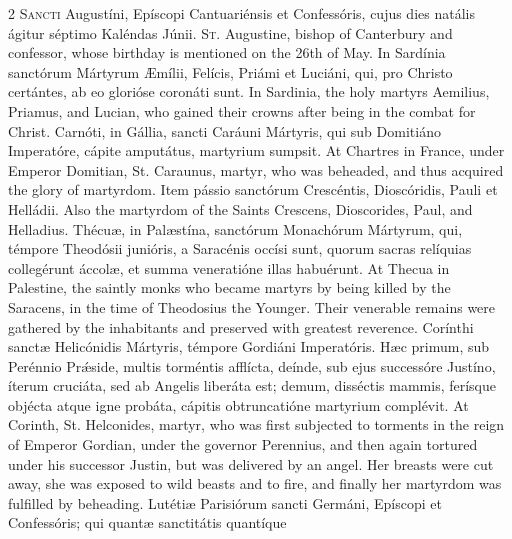 \begin{paracol}{2}
\lettrine[lines=2]{S}{ancti} Augustíni, 
 Epíscopi Cantuariénsis et Confessóris, cujus dies natális ágitur séptimo 
 Kaléndas Júnii.
\switchcolumn
{}
\lettrine[lines=2]{S}{t.} Augustine, bishop of Canterbury 
 and confessor, whose birthday is mentioned on the 26th of May.
\switchcolumn*
{}
In Sardínia sanctórum 
 Mártyrum Æmílii, Felícis, Priámi et Luciáni, qui, pro Christo certántes, ab 
 eo glorióse coronáti sunt.
\switchcolumn
{}
In Sardinia, the holy martyrs 
 Aemilius, Priamus, and Lucian, who gained their crowns after being in the 
 combat for Christ.
\switchcolumn*
{}
Carnóti, in Gállia, 
 sancti Caráuni Mártyris, qui sub Domitiáno Imperatóre, cápite amputátus, 
 martyrium sumpsit.
\switchcolumn
{}
At Chartres in France, under 
 Emperor Domitian, St. Caraunus, martyr, who was beheaded, and thus acquired 
 the glory of martyrdom.
\switchcolumn*
{}
Item pássio sanctórum 
 Crescéntis, Dioscóridis, Pauli et Helládii.
\switchcolumn
{}
Also the martyrdom of the Saints 
 Crescens, Dioscorides, Paul, and Helladius.
\switchcolumn*
{}
Thécuæ, in Palæstína, 
 sanctórum Monachórum Mártyrum, qui, témpore Theodósii junióris, a Saracénis 
 occísi sunt, quorum sacras relíquias collegérunt áccolæ, et summa 
 veneratióne illas habuérunt.
\switchcolumn
{}
At Thecua in Palestine, the saintly 
 monks who became martyrs by being killed by the Saracens, in the time of 
 Theodosius the Younger. Their venerable remains were gathered by the 
 inhabitants and preserved with greatest reverence.
\switchcolumn*
{}
Corínthi sanctæ 
 Helicónidis Mártyris, témpore Gordiáni Imperatóris. Hæc primum, sub 
 Perénnio Prǽside, multis torméntis afflícta, deínde, sub ejus successóre 
 Justíno, íterum cruciáta, sed ab Angelis liberáta est; demum, disséctis 
 mammis, ferísque objécta atque igne probáta, cápitis obtruncatióne martyrium 
 complévit.
\switchcolumn
{}
At Corinth, St. Helconides, martyr, 
 who was first subjected to torments in the reign of Emperor Gordian, under 
 the governor Perennius, and then again tortured under his successor Justin, 
 but was delivered by an angel. Her breasts were cut away, she was 
 exposed to wild beasts and to fire, and finally her martyrdom was fulfilled 
 by beheading.
\switchcolumn*
{}
Lutétiæ Parisiórum 
 sancti Germáni, Epíscopi et Confessóris; qui quantæ sanctitátis quantíque 

\end{paracol}
